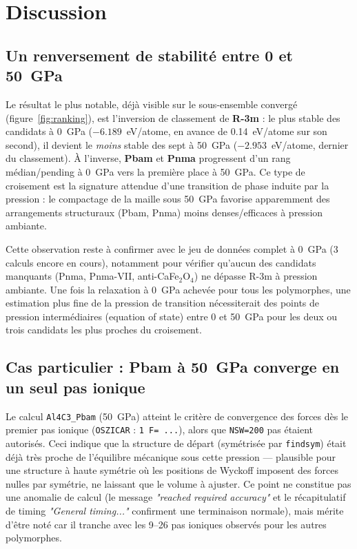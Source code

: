 \documentclass[11pt,a4paper]{article}
\begin{document}
\section{Discussion}

\subsection{Un renversement de stabilité entre 0 et 50~GPa}

Le résultat le plus notable, déjà visible sur le sous-ensemble convergé (figure~\ref{fig:ranking}),
est l'inversion de classement de \textbf{R-3m} : le plus stable des candidats à 0~GPa
($-6.189$~eV/atome, en avance de 0.14~eV/atome sur son second), il devient le
\emph{moins} stable des sept à 50~GPa ($-2.953$~eV/atome, dernier du classement). À l'inverse,
\textbf{Pbam} et \textbf{Pnma} progressent d'un rang médian/pending à 0~GPa vers la première
place à 50~GPa. Ce type de croisement est la signature attendue d'une transition de phase
induite par la pression : le compactage de la maille sous 50~GPa favorise apparemment des
arrangements structuraux (Pbam, Pnma) moins denses/efficaces à pression ambiante.

Cette observation reste à confirmer avec le jeu de données complet à 0~GPa (3 calculs encore
en cours), notamment pour vérifier qu'aucun des candidats manquants (Pnma, Pnma-VII,
anti-CaFe$_2$O$_4$) ne dépasse R-3m à pression ambiante. Une fois la relaxation à 0~GPa
achevée pour tous les polymorphes, une estimation plus fine de la pression de transition
nécessiterait des points de pression intermédiaires (equation of state) entre 0 et 50~GPa
pour les deux ou trois candidats les plus proches du croisement.

\subsection{Cas particulier : Pbam à 50~GPa converge en un seul pas ionique}

Le calcul \texttt{Al4C3\_Pbam} (50~GPa) atteint le critère de convergence des forces dès le
premier pas ionique (\texttt{OSZICAR} : \texttt{1 F= ...}), alors que \texttt{NSW=200} pas
étaient autorisés. Ceci indique que la structure de départ (symétrisée par \texttt{findsym})
était déjà très proche de l'équilibre mécanique sous cette pression — plausible pour une
structure à haute symétrie où les positions de Wyckoff imposent des forces nulles par
symétrie, ne laissant que le volume à ajuster. Ce point ne constitue pas une anomalie de
calcul (le message \emph{"reached required accuracy"} et le récapitulatif de timing
\emph{"General timing..."} confirment une terminaison normale), mais mérite d'être noté car il
tranche avec les 9--26 pas ioniques observés pour les autres polymorphes.
\end{document}
